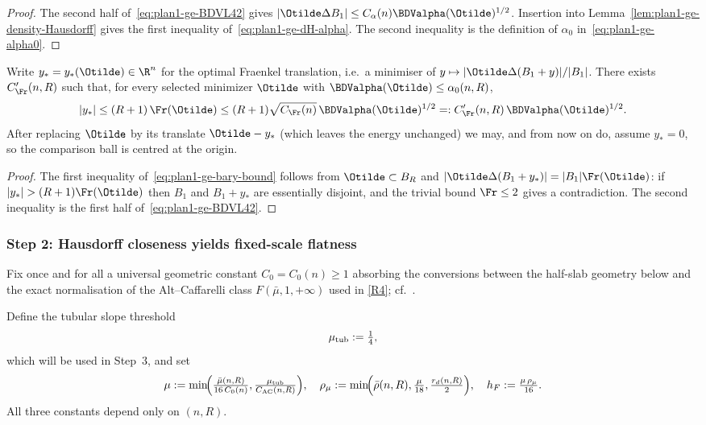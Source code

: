 \begin{proof}
The second half of~\eqref{eq:plan1-ge-BDVL42} gives
\(|\Otilde\Delta B_1|\le C_\alpha(n)\BDValpha(\Otilde)^{1/2}\). Insertion
into Lemma~\ref{lem:plan1-ge-density-Hausdorff} gives the first inequality
of~\eqref{eq:plan1-ge-dH-alpha}. The second inequality is the definition
of \(\alpha_0\) in~\eqref{eq:plan1-ge-alpha0}.
\end{proof}

\begin{lemma}
\label{lem:plan1-ge-bary}
Write \(y_*=y_*(\Otilde)\in\R^n\) for the optimal Fraenkel translation,
i.e.\ a minimiser of \(y\mapsto|\Otilde\Delta(B_1+y)|/|B_1|\). There exists
\(C_{\Fr}'(n,R)\) such that, for every selected minimizer \(\Otilde\) with
\(\BDValpha(\Otilde)\le\alpha_0(n,R)\),
\begin{equation}\label{eq:plan1-ge-bary-bound}
   |y_*|\le(R+1)\,\Fr(\Otilde)
   \le (R+1)\sqrt{C_{\Fr}(n)}\,\BDValpha(\Otilde)^{1/2}
   =: C_{\Fr}'(n,R)\,\BDValpha(\Otilde)^{1/2}.
\end{equation}
After replacing \(\Otilde\) by its translate \(\Otilde-y_*\) (which leaves
the energy unchanged) we may, and from now on do, assume \(y_*=0\), so the
comparison ball is centred at the origin.
\end{lemma}

\begin{proof}
The first inequality of~\eqref{eq:plan1-ge-bary-bound} follows from
\(\Otilde\subset B_R\) and \(|\Otilde\Delta(B_1+y_*)|=|B_1|\Fr(\Otilde)\):
if \(|y_*|>(R+1)\Fr(\Otilde)\) then \(B_1\) and \(B_1+y_*\) are essentially
disjoint, and the trivial bound \(\Fr\le 2\) gives a contradiction. The
second inequality is the first half of~\eqref{eq:plan1-ge-BDVL42}.
\end{proof}

\subsubsection{Step 2: Hausdorff closeness yields fixed-scale flatness}
\label{subsubsec:plan1-ge-S2}

Fix once and for all a universal geometric constant \(C_0=C_0(n)\ge 1\)
absorbing the conversions between the half-slab geometry below and the
exact normalisation of the Alt--Caffarelli class
\(F(\bar\mu,1,+\infty)\) used in \ref{R4}; cf.\
\cite[\S 4]{BDV}.

Define the tubular slope threshold
\begin{equation}\label{eq:plan1-ge-mutub}
   \mu_{\rm tub}:=\tfrac14,
\end{equation}
which will be used in Step~3, and set
\begin{equation}\label{eq:plan1-ge-mu-choices}
   \mu:=\min\!\Bigl(\tfrac{\bar\mu(n,R)}{16\,C_0(n)},
                    \tfrac{\mu_{\rm tub}}{C_{\rm AC}(n,R)}\Bigr),\quad
   \rho_\mu:=\min\!\Bigl(\bar\rho(n,R),\tfrac{\mu}{18},\tfrac{r_d(n,R)}{2}\Bigr),\quad
   h_F:=\tfrac{\mu\,\rho_\mu}{16}.
\end{equation}
All three constants depend only on \((n,R)\).

